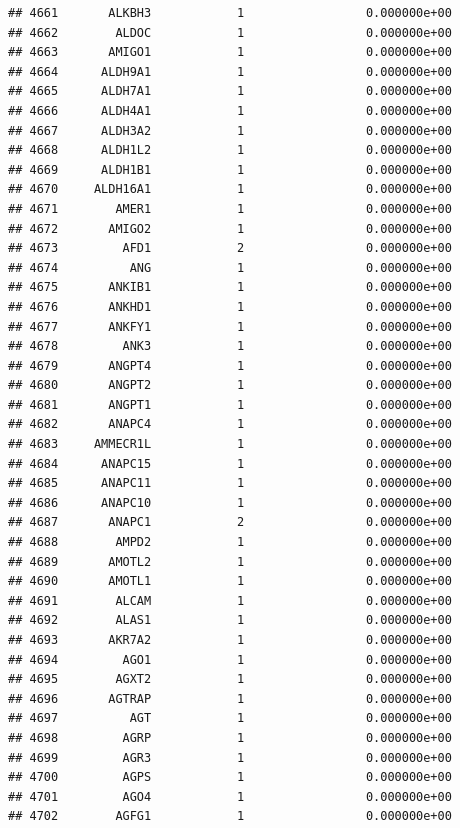 \documentclass[
]{article}
\begin{document}
\begin{verbatim}
## 4661       ALKBH3            1                 0.000000e+00
## 4662        ALDOC            1                 0.000000e+00
## 4663       AMIGO1            1                 0.000000e+00
## 4664      ALDH9A1            1                 0.000000e+00
## 4665      ALDH7A1            1                 0.000000e+00
## 4666      ALDH4A1            1                 0.000000e+00
## 4667      ALDH3A2            1                 0.000000e+00
## 4668      ALDH1L2            1                 0.000000e+00
## 4669      ALDH1B1            1                 0.000000e+00
## 4670     ALDH16A1            1                 0.000000e+00
## 4671        AMER1            1                 0.000000e+00
## 4672       AMIGO2            1                 0.000000e+00
## 4673         AFD1            2                 0.000000e+00
## 4674          ANG            1                 0.000000e+00
## 4675       ANKIB1            1                 0.000000e+00
## 4676       ANKHD1            1                 0.000000e+00
## 4677       ANKFY1            1                 0.000000e+00
## 4678         ANK3            1                 0.000000e+00
## 4679       ANGPT4            1                 0.000000e+00
## 4680       ANGPT2            1                 0.000000e+00
## 4681       ANGPT1            1                 0.000000e+00
## 4682       ANAPC4            1                 0.000000e+00
## 4683     AMMECR1L            1                 0.000000e+00
## 4684      ANAPC15            1                 0.000000e+00
## 4685      ANAPC11            1                 0.000000e+00
## 4686      ANAPC10            1                 0.000000e+00
## 4687       ANAPC1            2                 0.000000e+00
## 4688        AMPD2            1                 0.000000e+00
## 4689       AMOTL2            1                 0.000000e+00
## 4690       AMOTL1            1                 0.000000e+00
## 4691        ALCAM            1                 0.000000e+00
## 4692        ALAS1            1                 0.000000e+00
## 4693       AKR7A2            1                 0.000000e+00
## 4694         AGO1            1                 0.000000e+00
## 4695        AGXT2            1                 0.000000e+00
## 4696       AGTRAP            1                 0.000000e+00
## 4697          AGT            1                 0.000000e+00
## 4698         AGRP            1                 0.000000e+00
## 4699         AGR3            1                 0.000000e+00
## 4700         AGPS            1                 0.000000e+00
## 4701         AGO4            1                 0.000000e+00
## 4702        AGFG1            1                 0.000000e+00

\end{verbatim}
\end{document}
